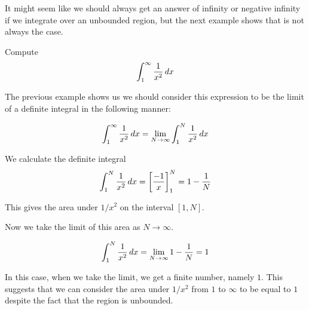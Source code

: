 \documentclass{ximera}
\begin{document}
It might seem like we should always get an answer of infinity or negative infinity if we integrate over an unbounded region, but the next example shows that is not always the case.

\begin{example}
Compute 
\[
\int_{1}^{\infty} \frac{1}{x^{2}} \mathop{}\!d x
\]

\begin{explanation}
The previous example shows us we should consider this expression to be the limit of a definite integral 
in the following manner:

\[
\int_{1}^{\infty} \frac{1}{x^{2}} \mathop{}\!d x=\lim_{N \to \infty} \int_{1}^{N} \frac{1}{x^{2}} \mathop{}\!d x
\]

We calculate the definite integral 
\[
\int_{1}^{N} \frac{1}{x^{2}} \mathop{}\!d x= \bigg[ \frac{-1}{x} \bigg]_{1}^{N}=1-\frac{1}{N}
\]

This gives the area under $1/x^{2}$ on the interval $[1, N]$. 

\begin{image}
\end{image}

Now we take the limit of this area as $N \to \infty$. 

\[
\int_{1}^{N} \frac{1}{x^{2}} \mathop{}\!d x= \lim_{N \to \infty} 1-\frac{1}{N}=1
\]
  
In this case, when we take the limit, we get a finite number, namely $1$. This suggests that we can consider the 
area under $1/x^{2}$ from $1$ to $\infty$ to be equal to $1$ despite the fact that the region is unbounded. 



\end{explanation}
\end{example}
\end{document}
